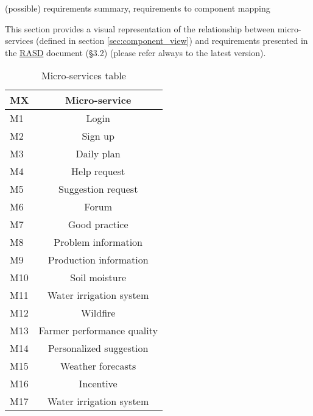 (possible) requirements summary, requirements to component mapping

This section provides a visual representation of the relationship between micro-services (defined in section \ref{sec:component_view}) and requirements presented in the \href{https://github.com/MarcoRomanini/GoriRomaniniWatanabe/tree/main/DeliveryFolder}{RASD} document (\S 3.2) (please refer always to the latest version).

\begin{table}[H]
    \setlength\arrayrulewidth{1pt}
    \centering
    \begin{tabular}{|l|c|}
        \rowcolor{myblue}
        \hline
        \color{white}MX & \color{white}Micro-service\\
        \hline
        M1      &   Login\\
        \hline
        M2      &   Sign up\\
        \hline
        M3      &   Daily plan\\
        \hline
        M4      &   Help request\\
        \hline
        M5      &   Suggestion request\\
        \hline
        M6      &   Forum\\
        \hline
        M7      &   Good practice\\
        \hline
        M8      &   Problem information\\
        \hline
        M9      &   Production information\\
        \hline
        M10      &   Soil moisture\\
        \hline
        M11      &   Water irrigation system\\
        \hline
        M12      &   Wildfire\\
        \hline
        M13      &   Farmer performance quality\\
        \hline
        M14      &   Personalized suggestion\\
        \hline
        M15      &   Weather forecasts\\
        \hline
        M16      &   Incentive\\
        \hline
        M17      &   Water irrigation system\\
        \hline
    \end{tabular}
    
    \caption{\label{tab:microservices_table}Micro-services table}
    
\end{table}




